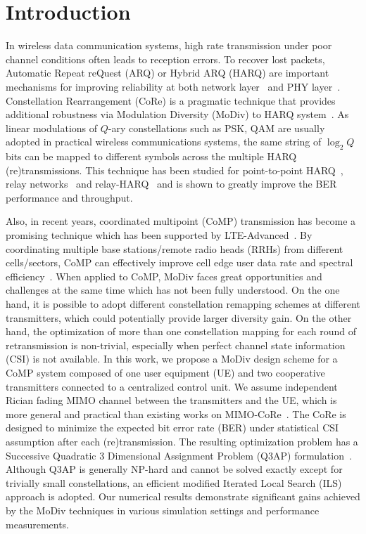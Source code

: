 \documentclass[journal]{IEEEtran}
\begin{document}
\section{Introduction}
\label{sec:intro}

In wireless data communication systems, high rate transmission under poor
channel conditions often leads to reception errors. To recover lost packets,
Automatic Repeat reQuest (ARQ) or Hybrid ARQ (HARQ) are important mechanisms for
improving reliability at both network layer~\cite{TS36.331} and PHY
layer~\cite{TS36.213}. Constellation Rearrangement (CoRe) is a pragmatic
technique that provides additional robustness via Modulation Diversity (MoDiv)
to HARQ system~\cite{benelli1992new}.
As linear modulations of $Q$-ary constellations such as PSK, QAM are usually
adopted in practical wireless communications systems, the same string of
$\log_2Q$ bits can be mapped to different symbols across the multiple HARQ
(re)transmissions. This technique has been studied for point-to-point
HARQ~\cite{samra2005symbol}, relay
networks~\cite{seddik2008trans, khormuji2008rate} and
relay-HARQ~\cite{kim2009design, ryu2011ber, wu2016modulation} and is shown to
greatly improve the BER performance and throughput.

Also, in recent years, coordinated multipoint (CoMP) transmission has become a
promising technique which has been supported by
LTE-Advanced~\cite{sawahashi2010coordinated}. By coordinating multiple base
stations/remote radio heads (RRHs) from different cells/sectors, CoMP can
effectively improve cell edge user data rate and spectral
efficiency~\cite{irmer2011coordinated}. When applied to CoMP, MoDiv faces great
opportunities and challenges at the same time which has not been fully understood. On the one hand,
it is possible to adopt different constellation remapping schemes at different
transmitters, which could potentially provide larger diversity gain. On the
other hand, the optimization of more than one constellation mapping for each
round of retransmission is non-trivial, especially when perfect channel state
information (CSI) is not available.
In this work, we propose a MoDiv design scheme for a CoMP system composed of one
user equipment (UE) and two cooperative transmitters connected to a centralized
control unit. We assume independent Rician fading MIMO channel between the transmitters
and the UE, which is more general and practical than existing works on
MIMO-CoRe~\cite{bahadori2014performance, zhao2009harq}.
The CoRe is designed to minimize the expected bit error rate (BER) under
statistical CSI assumption after each (re)transmission. The resulting
optimization problem has a Successive Quadratic 3 Dimensional Assignment Problem
(Q3AP) formulation~\cite{hahn2008quadratic}. Although Q3AP is generally NP-hard and
cannot be solved exactly except for trivially small constellations, an
efficient modified Iterated Local Search (ILS) approach is adopted. Our
numerical results demonstrate significant gains achieved by the MoDiv techniques
in various simulation settings and performance measurements.
\end{document}
